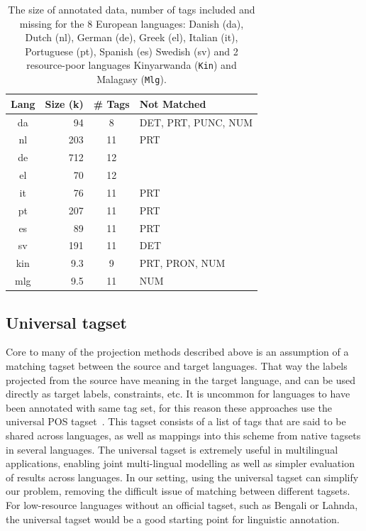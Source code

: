\documentclass[12pt,twoside,final,hidelinks]{ltthesis}
\theoremstyle{definition}
\begin{document}
\begin{table}[t]
\centering
\tabcolsep 3pt
\begin{tabular}{crcl}
\toprule
Lang & Size (k) & \# Tags & Not Matched \\
\midrule
da & 94 & 8 & DET, PRT, PUNC, NUM \\
nl & 203 & 11 & PRT \\
de & 712 & 12 & \\
el & 70 & 12 & \\
it & 76 & 11 & PRT \\
pt & 207 & 11 & PRT \\
es & 89 & 11 & PRT \\
sv & 191 & 11 & DET \\
\midrule
kin & 9.3 & 9 & PRT, PRON, NUM\\
mlg & 9.5 & 11 & NUM \\
\bottomrule
\end{tabular}
\caption[The size of annotated data, number of tags included and missing for all considered languages]{The size of annotated data, number of tags included and missing for the 8 European languages: Danish (da), Dutch (nl), German (de), Greek (el), Italian (it), Portuguese (pt), Spanish (es) Swedish (sv) and 2 resource-poor languages Kinyarwanda (\texttt{Kin}) and Malagasy (\texttt{Mlg}).} 
\label{tab:tagMissing}
\end{table}

\subsection{Universal tagset}
\label{sec:universalTagset}
Core to many of the projection methods described above is an assumption of a matching tagset between the source and target languages. That way the labels projected from the source have meaning in the target language, and can be used directly as target labels, constraints, etc. It is uncommon for languages to have been annotated with same tag set, for this reason these approaches use the universal POS tagset~\cite{UniversalTagSet}. This tagset consists of a list of tags that are said to be shared across languages, as well as mappings into this scheme from native tagsets in several languages. The universal tagset is extremely useful in multilingual applications, enabling joint multi-lingual modelling as well as simpler evaluation of results across languages. 
In our setting, using the universal tagset can simplify our problem, removing the difficult issue of matching between different tagsets. 
For low-resource languages without an official tagset, such as Bengali or Lahnda, the universal tagset would be a good starting point for linguistic annotation.
\end{document}
